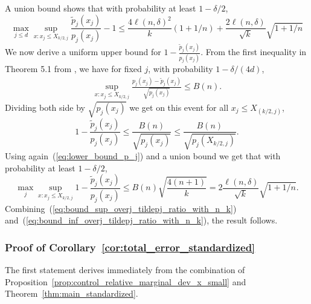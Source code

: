 \documentclass{article}
\numberwithin{equation}{section}
\begin{document}
      A union bound %
      shows that with probability at least $1- \delta/2$,
         \begin{equation}
          \label{eq:bound_sup_overj_tildepj_ratio_with_n_k}
          \max_{j\le d}\sup_{x: x_j \le X_{ k/2,j}} \frac{\tilde p_j(x_j)}{p_j(x_j)} -1 \le \frac{4 \ell(n,\delta)^2}{k} (1 +1/n) + %
          \frac{2 \ell(n,\delta)}{\sqrt{k}} \sqrt{1 +1/n}
\end{equation}
We now derive a uniform  upper bound for $1 - \frac{\tilde p_j(x_j)}{p_j(x_j)} $. From the first inequality in Theorem 5.1 from \cite{boucheron2005theory}, we have for fixed $j$, with probability $1 - \delta/(4d)$, 
\begin{align*}
  \sup_{x: x_j \le X_{ k/2,j}}
   \frac{p_j(x_j) - \tilde p_j(x_j)}{\sqrt{ p_j(x_j)}}  \le B(n). 
\end{align*}
Dividing both side by $\sqrt{p_j(x_j)}$ we get on this event for all
$x_j \le X_{ (k/2,j)}$,
$$
1 - \frac{\tilde p_j(x_j)}{p_j(x_j)} \le \frac{B(n)}{\sqrt{p_j(x_j)}}
  \le \frac{B(n)}{\sqrt{p_j(X_{k/2,j})}}. 
    $$
    Using again~(\ref{eq:lower_bound_p_j}) and a union bound we get that with probability at least $1 - \delta/2$, 
    \begin{equation}
      \label{eq:bound_inf_overj_tildepj_ratio_with_n_k}
\max_j \sup_{x: x_j \le X_{ k/2,j}} 1 - \frac{\tilde p_j(x_j)}{p_j(x_j)}
\le B(n) \sqrt{ \frac{4(n+1)}{k}} = 2 \frac{\ell(n,\delta)}{\sqrt{k}} \sqrt{1 + 1/n}. 
          \end{equation}
Combining~(\ref{eq:bound_sup_overj_tildepj_ratio_with_n_k}) and~(\ref{eq:bound_inf_overj_tildepj_ratio_with_n_k}), the result follows. 


\subsubsection{Proof of Corollary~\ref{cor:total_error_standardized}}
  The first statement derives immediately from the combination of Proposition~\ref{prop:control_relative_marginal_dev_x_small} and Theorem~\ref{thm:main_standardized}.
\end{document}
